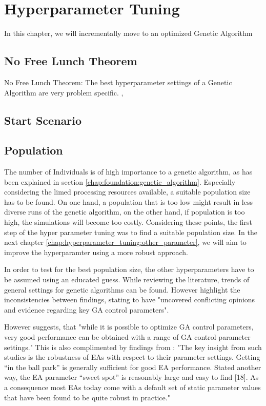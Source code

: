 \chapter{Hyperparameter Tuning}
\label{chap:hyperparameter_tuning}
In this chapter, we will incrementally move to an optimized Genetic Algorithm

\section{No Free Lunch Theorem}
No Free Lunch Theorem:
The best hyperparameter settings of a Genetic Algorithm are very problem specific. \cite{kacprzyk_parameter_2007}, \cite{dao_maximising_2016} 

\section{Start Scenario}

\section{Population}
\label{chap:hyperparameter_tuning:population}
The number of Individuals is of high importance to a genetic algorithm, as has been explained in section \ref{chap:foundation:genetic_algorithm}. Especially considering the limed processing resources available, a suitable population size has to be found. On one hand, a population that is too low might result in less diverse runs of the genetic algorithm, on the other hand, if population is too high, the simulations will become too costly. Considering these points, the first step of the hyper parameter tuning was to find a suitable population size. In the next chapter \ref{chap:hyperparameter_tuning:other_parameter}, we will aim to improve the hyperparamter using a more robust approach.

In order to test for the best population size, the other hyperparameters have to be assumed using an educated guess. While reviewing the literature, trends of general settings for genetic algorithms can be found. However \cite{mills_determining_2015} highlight the inconsistencies between findings, stating to have "uncovered conflicting opinions and evidence regarding key GA control parameters". 

However \cite{grefenstette_optimization_1986} suggests, that "while it is possible to optimize GA control parameters, very good performance can be obtained with a range of GA control parameter settings." 
This is also complimented by findings from \cite{kacprzyk_parameter_2007}: "The key insight from such studies is the robustness of EAs with respect to their parameter settings. Getting “in the ball park” is generally sufficient for good EA performance. Stated another way, the EA parameter “sweet spot” is reasonably large and easy to find [18]. As a consequence most EAs today come with a default set of static parameter values that have been found to be quite robust in practice."


